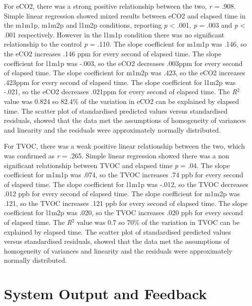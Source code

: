 \documentclass{ueacmpstyle}
\begin{document}
        
        For eCO2, there was a strong positive relationship between the two, \textit{r} = .908. Simple linear regression showed mixed results between eCO2 and elapsed time in the m1m1p, m1m2p and l1m2p conditions, reporting \textit{p} < .001, \textit{p} = .003 and \textit{p} < .001 respectively. However in the l1m1p condition there was no significant relationship to the control \textit{p} = .110. The slope coefficient for m1m1p was .146, so the eCO2 increases .146 ppm for every second of elapsed time. The slope coefficient for l1m1p was -.003, so the eCO2 decreases .003ppm for every second of elapsed time. The slope coefficient for m1m2p was .423, so the eCO2 increases .423ppm for every second of elapsed time. The slope coefficient for l1m2p was -.021, so the eCO2 decreases .021ppm for every second of elapsed time. The \textit{R$^2$} value was 0.824 so 82.4\% of the variation in eCO2 can be explained by elapsed time. The scatter plot of standardised predicted values versus standardised residuals, showed that the data met the assumptions of homogeneity of variances and linearity and the residuals were approximately normally distributed.
        
        For TVOC, there was a weak positive linear relationship between the two, which was confirmed as \textit{r} = .265. Simple linear regression showed there was a non significant relationship between TVOC and elapsed time \textit{p} = .04. The slope coefficient for m1m1p was .074, so the TVOC increases .74 ppb for every second of elapsed time. The slope coefficient for l1m1p was -.012, so the TVOC decreases .012 ppb for every second of elapsed time. The slope coefficient for m1m2p was .121, so the TVOC increases .121 ppb for every second of elapsed time. The slope coefficient for l1m2p was .020, so the TVOC increases .020 ppb for every second of elapsed time. The \textit{R$^2$} value was 0.7 so 70\% of the variation in TVOC can be explained by elapsed time. The scatter plot of standardised predicted values versus standardised residuals, showed that the data met the assumptions of homogeneity of variances and linearity and the residuals were approximately normally distributed. 
        
        
        
        
        
    
    \section{System Output and Feedback} \label{Sec: Output and Feedback}
        
\end{document}
